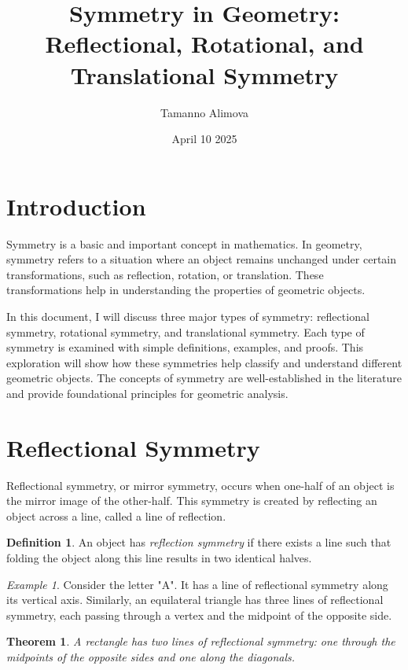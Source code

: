 \documentclass{article}
\title{Symmetry in Geometry: Reflectional, Rotational, and Translational Symmetry}
\author{Tamanno Alimova}
\date{April 10 2025}
\theoremstyle{plain}
\newtheorem{theorem}{Theorem}
\theoremstyle{definition}
\newtheorem{definition}{Definition}
\theoremstyle{remark}
\newtheorem{example}{Example}
\begin{document}
\maketitle

\section{Introduction}
Symmetry is a basic and important concept in mathematics. In geometry, symmetry refers to a situation where an object remains unchanged under certain transformations, such as reflection, rotation, or translation. These transformations help in understanding the properties of geometric objects.

In this document, I will discuss three major types of symmetry: reflectional symmetry, rotational symmetry, and translational symmetry. Each type of symmetry is examined with simple definitions, examples, and proofs. This exploration will show how these symmetries help classify and understand different geometric objects. The concepts of symmetry are well-established in the literature \cite{Greenberg2008} and provide foundational principles for geometric analysis.

\section{Reflectional Symmetry}
Reflectional symmetry, or mirror symmetry, occurs when one-half of an object is the mirror image of the other-half. This symmetry is created by reflecting an object across a line, called a line of reflection.

\begin{definition}\label{def:reflectional}
An object has \textit{ reflection symmetry} if there exists a line such that folding the object along this line results in two identical halves.
\end{definition} 

\begin{example}
Consider the letter "A". It has a line of reflectional symmetry along its vertical axis. Similarly, an equilateral triangle has three lines of reflectional symmetry, each passing through a vertex and the midpoint of the opposite side.
\end{example}

\begin{theorem}\label{thm:rectangle}
A rectangle has two lines of reflectional symmetry: one through the midpoints of the opposite sides and one along the diagonals.
\end{theorem}
\end{document}
